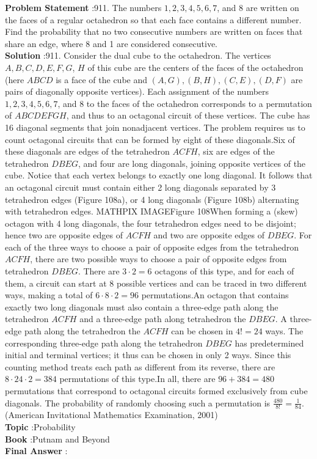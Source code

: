 \documentclass[10pt]{article}
\begin{document}
\textbf{Problem Statement} :911. The numbers $1,2,3,4,5,6,7$, and 8 are written on the faces of a regular octahedron so that each face contains a different number. Find the probability that no two consecutive numbers are written on faces that share an edge, where 8 and 1 are considered consecutive.\\
\textbf{Solution} :911. Consider the dual cube to the octahedron. The vertices $A, B, C, D, E, F, G$, $H$ of this cube are the centers of the faces of the octahedron (here $A B C D$ is a face of the cube and $(A, G),(B, H),(C, E),(D, F)$ are pairs of diagonally opposite vertices). Each assignment of the numbers $1,2,3,4,5,6,7$, and 8 to the faces of the octahedron corresponds to a permutation of $A B C D E F G H$, and thus to an octagonal circuit of these vertices. The cube has 16 diagonal segments that join nonadjacent vertices. The problem requires us to count octagonal circuits that can be formed by eight of these diagonals.Six of these diagonals are edges of the tetrahedron $A C F H$, six are edges of the tetrahedron $D B E G$, and four are long diagonals, joining opposite vertices of the cube. Notice that each vertex belongs to exactly one long diagonal. It follows that an octagonal circuit must contain either 2 long diagonals separated by 3 tetrahedron edges (Figure 108a), or 4 long diagonals (Figure 108b) alternating with tetrahedron edges.
MATHPIX IMAGEFigure 108When forming a (skew) octagon with 4 long diagonals, the four tetrahedron edges need to be disjoint; hence two are opposite edges of $A C F H$ and two are opposite edges of $D B E G$. For each of the three ways to choose a pair of opposite edges from the tetrahedron $A C F H$, there are two possible ways to choose a pair of opposite edges from tetrahedron $D B E G$. There are $3 \cdot 2=6$ octagons of this type, and for each of them, a circuit can start at 8 possible vertices and can be traced in two different ways, making a total of $6 \cdot 8 \cdot 2=96$ permutations.An octagon that contains exactly two long diagonals must also contain a three-edge path along the tetrahedron $A C F H$ and a three-edge path along tetrahedron the $D B E G$. A three-edge path along the tetrahedron the $A C F H$ can be chosen in $4 !=24$ ways. The corresponding three-edge path along the tetrahedron $D B E G$ has predetermined initial and terminal vertices; it thus can be chosen in only 2 ways. Since this counting method treats each path as different from its reverse, there are $8 \cdot 24 \cdot 2=384$ permutations of this type.In all, there are $96+384=480$ permutations that correspond to octagonal circuits formed exclusively from cube diagonals. The probability of randomly choosing such a permutation is $\frac{480}{8 !}=\frac{1}{84}$.(American Invitational Mathematics Examination, 2001) \\
\textbf{Topic} :Probability\\
\textbf{Book} :Putnam and Beyond\\
\textbf{Final Answer} :\\
\end{document}

